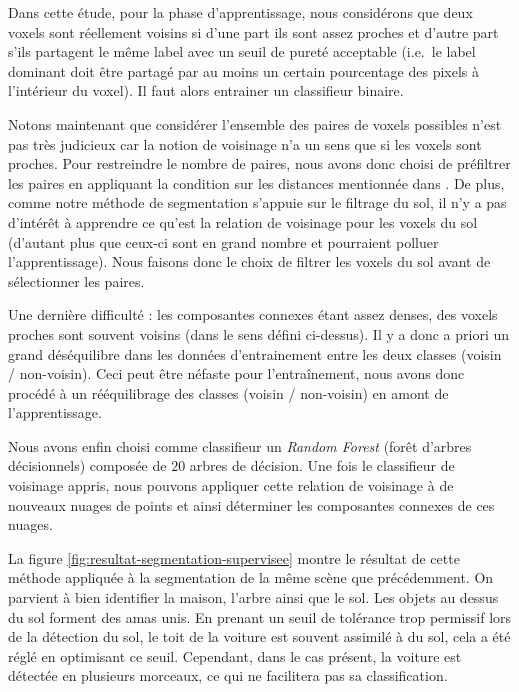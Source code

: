 \documentclass[a4paper, onecolumn, 11pt]{article}
\begin{document}
Dans cette étude, pour la phase d'apprentissage, nous considérons que deux voxels sont réellement voisins si d'une part ils sont assez proches et d'autre part s'ils partagent le même label avec un seuil de pureté acceptable (i.e.\ le label dominant doit être partagé par au moins un certain pourcentage des pixels à l'intérieur du voxel). Il faut alors entrainer un classifieur binaire. 

Notons maintenant que considérer l'ensemble des paires de voxels possibles n'est pas très judicieux car la notion de voisinage n'a un sens que si les voxels sont proches. Pour restreindre le nombre de paires, nous avons donc choisi de préfiltrer les paires en appliquant la condition sur les distances mentionnée dans  \cite{aka_article}. De plus, comme notre méthode de segmentation s'appuie sur le filtrage du sol, il n'y a pas d'intérêt à apprendre ce qu'est la relation de voisinage pour les voxels du sol (d'autant plus que ceux-ci sont en grand nombre et pourraient polluer l'apprentissage). Nous faisons donc le choix de filtrer les voxels du sol avant de sélectionner les paires. 

Une dernière difficulté : les composantes connexes étant assez denses, des voxels proches sont souvent voisins (dans le sens défini ci-dessus).  Il y a donc a priori un grand déséquilibre dans les données d'entrainement entre les deux classes (voisin / non-voisin). Ceci peut être néfaste pour l'entraînement, nous avons donc procédé à un rééquilibrage des classes (voisin / non-voisin) en amont de l'apprentissage. 

Nous avons enfin choisi comme classifieur un \emph{Random Forest} (forêt d'arbres décisionnels) composée de $20$ arbres de décision. Une fois le classifieur de voisinage appris, nous pouvons appliquer cette relation de voisinage à de nouveaux nuages de points et ainsi déterminer les composantes connexes de ces nuages.

La figure \ref{fig:resultat-segmentation-supervisee} montre le résultat de cette méthode appliquée à la segmentation de la même scène que précédemment. On parvient à bien identifier la maison, l'arbre ainsi que le sol. Les objets au dessus du sol forment des amas unis. En prenant un seuil de tolérance trop permissif lors de la détection du sol, le toit de la voiture est souvent assimilé à du sol, cela a été réglé en optimisant ce seuil. Cependant, dans le cas présent, la voiture est détectée en plusieurs morceaux, ce qui ne facilitera pas sa classification.
\end{document}
